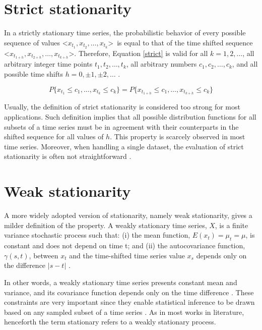 \documentclass[11pt]{dippg}
\begin{document}
\section{Strict stationarity}

In a strictly stationary time series, the probabilistic behavior of every possible sequence of values \textless$x_{t_1}, x_{t_2}, \dots, x_{t_k}$\textgreater\ is equal to that of the time shifted sequence \textless$x_{t_{1+h}}, x_{t_{2+h}}, \dots, x_{t_{k+h}}$\textgreater. Therefore, Equation \ref{strict} is valid for all $k = 1, 2, \dots$, all arbitrary integer time points $t_1, t_2, \dots, t_k$, all arbitrary numbers $c_1, c_2, \dots, c_k$, and all possible time shifts $h=0, \pm1, \pm2, \dots$ \cite{shumway_time_2017}.

\begin{equation} \label{strict}
 P\{x_{t_1} \le c_1, \dots, x_{t_k} \le c_k\} = P\{x_{t_{1+h}} \le c_1, \dots, x_{t_{k+h}} \le c_k\}
\end{equation}

Usually, the definition of strict stationarity is considered too strong for most applications. Such definition implies that all possible distribution functions for all subsets of a time series must be in agreement with their counterparts in the shifted sequence for all values of $h$. This property is scarcely observed in most time series. Moreover, when handling a single dataset, the evaluation of strict stationarity is often not straightforward \cite{shumway_time_2017}.

\section{Weak stationarity}

A more widely adopted version of stationarity, namely weak stationarity, gives a milder definition of the property. A weakly stationary time series, $X$, is a finite variance stochastic process such that:
(i) the mean function, $E(x_t) = \mu_t = \mu$, is constant and does not depend on time t; and
(ii) the autocovariance function, $\gamma(s,t)$, between $x_t$ and the time-shifted time series value $x_s$ depends only on the difference $|s - t|$ \cite{gujarati_basic_2002,shumway_time_2017}.

In other words, a weakly stationary time series presents constant mean and variance, and its covariance function depends only on the time difference \cite{yang_nonstationarity_2010}. These constraints are very important since they enable statistical inference to be drawn based on any sampled subset of a time series \cite{hanssens_market_2003}. As in most works in literature, henceforth the term stationary refers to a weakly stationary process. 
\end{document}

